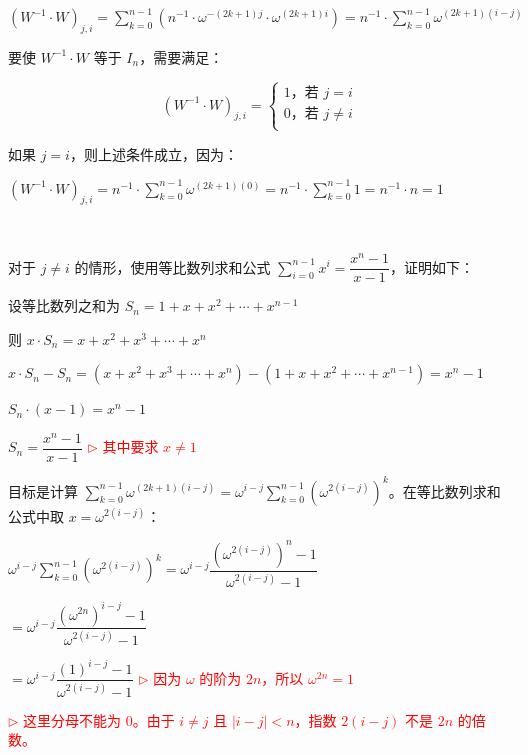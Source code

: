 $(W^{-1} \cdot W)_{j, i} = \sum\limits_{k=0}^{n-1}(n^{-1}\cdot \omega^{-(2k+1)j} \cdot \omega^{(2k+1)i}) = n^{-1}\cdot\sum\limits_{k=0}^{n-1}\omega^{(2k+1)(i-j)}$

要使 $W^{-1} \cdot W$ 等于 $I_n$，需要满足：

\[
(W^{-1} \cdot W)_{j, i} = \begin{cases}
\text{1，若 } j = i \\
\text{0，若 } j \neq i \\
\end{cases}
\]

如果 $j = i$，则上述条件成立，因为：

$(W^{-1} \cdot W)_{j, i} = n^{-1}\cdot\sum\limits_{k=0}^{n-1}\omega^{(2k+1)(0)} =  n^{-1}\cdot\sum\limits_{k=0}^{n-1}1 = n^{-1} \cdot n = 1$

$ $

对于 $j \neq i$ 的情形，使用等比数列求和公式 $\sum\limits_{i=0}^{n-1}x^i = \dfrac{x^n - 1}{x - 1}$，证明如下：

\begin{tcolorbox}[title={\textbf{\tboxtheorem{\ref*{subsec:ntt-backward}} 等比数列求和公式}}]

设等比数列之和为 $S_n = 1 + x + x^2 + \cdots + x^{n - 1}$

则 $x \cdot S_n = x + x^2 + x^3 + \cdots + x^{n}$

$x \cdot S_n - S_n = (x + x^2 + x^3 + \cdots + x^{n}) - (1 + x + x^2 + \cdots + x^{n - 1}) = x^n - 1$

$S_n\cdot (x - 1) = x^n - 1$

$S_n = \dfrac{x^n - 1}{x - 1}$ \textcolor{red}{ $\rhd$ 其中要求 $x \neq 1$}

\end{tcolorbox}

目标是计算 $\sum\limits_{k=0}^{n-1}\omega^{(2k+1)(i-j)} = \omega^{i-j} \sum\limits_{k=0}^{n-1}(\omega^{2(i-j)})^k$。在等比数列求和公式中取 $x = \omega^{2(i-j)}$：

$\omega^{i-j} \sum\limits_{k=0}^{n-1}(\omega^{2(i-j)})^k = \omega^{i-j} \dfrac{(\omega^{2(i-j)})^n - 1}{\omega^{2(i-j)} - 1}$ 

$= \omega^{i-j} \dfrac{(\omega^{2n})^{i - j} - 1}{\omega^{2(i-j)} - 1}$

$= \omega^{i-j} \dfrac{(1)^{i - j} - 1}{\omega^{2(i-j)} - 1}$ \textcolor{red}{ $\rhd$ 因为 $\omega$ 的阶为 $2n$，所以 $\omega^{2n}=1$}

\textcolor{red}{ $\rhd$ 这里分母不能为 0。由于 $i \neq j$ 且 $|i-j| < n$，指数 $2(i-j)$ 不是 $2n$ 的倍数。}

